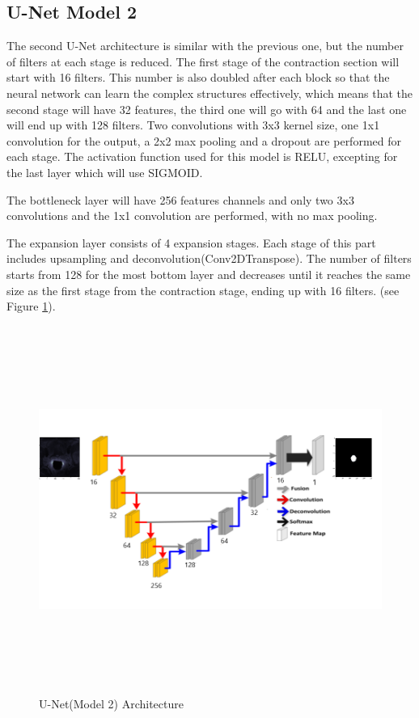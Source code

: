 \documentclass[runningheads,a4paper,11pt]{report}
\begin{document}
\subsection{U-Net Model 2}
\label{section:model1}

The second U-Net architecture is similar with the previous one, but the number of filters at each stage is reduced. The first stage of the contraction section will start with 16 filters. This number is also doubled after each block so that the neural network can learn the complex structures effectively, which means that the second stage will have 32 features, the third one will go with 64 and the last one will end up with 128 filters. Two convolutions with 3x3 kernel size, one 1x1 convolution for the output, a 2x2 max pooling and a dropout are performed for each stage. The activation function used for this model is RELU, excepting for the last layer which will use SIGMOID.

The bottleneck layer will have 256 features channels and only two 3x3 convolutions and the 1x1 convolution are performed, with no max pooling. 

The expansion layer consists of 4 expansion stages. Each stage of this part includes upsampling and deconvolution(Conv2DTranspose). The number of filters starts from 128 for the most bottom layer and decreases until it reaches the same size as the first stage from the contraction stage, ending up with 16 filters. (see Figure \ref{unet_architecture2}). \par 

\begin{figure}[!h]
	\centerline{\includegraphics[width=20cm, height=12cm]{images/Unet_model2.png}}  
	\caption{U-Net(Model 2) Architecture}
	\label{unet_architecture2}
\end{figure}
\end{document}
